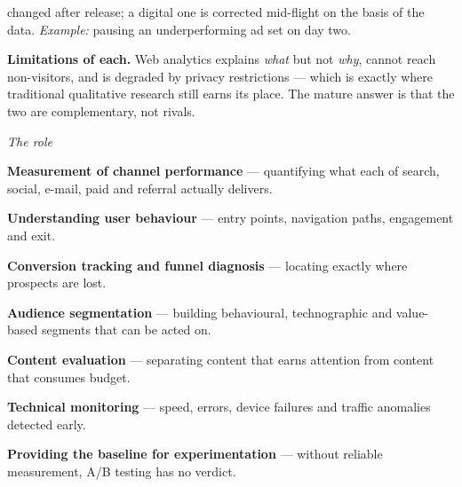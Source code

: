 \begin{qlist}
\begin{apts}
      changed after release; a digital one is corrected mid-flight on the basis
      of the data. \emph{Example:} pausing an underperforming ad set on day two.
\item \textbf{Limitations of each.} Web analytics explains \emph{what} but not
      \emph{why}, cannot reach non-visitors, and is degraded by privacy
      restrictions --- which is exactly where traditional qualitative research
      still earns its place. The mature answer is that the two are complementary,
      not rivals.
\end{apts}

\textit{The role}
\begin{apts}
\item \textbf{Measurement of channel performance} --- quantifying what each of
      search, social, e-mail, paid and referral actually delivers.
\item \textbf{Understanding user behaviour} --- entry points, navigation paths,
      engagement and exit.
\item \textbf{Conversion tracking and funnel diagnosis} --- locating exactly
      where prospects are lost.
\item \textbf{Audience segmentation} --- building behavioural, technographic and
      value-based segments that can be acted on.
\item \textbf{Content evaluation} --- separating content that earns attention
      from content that consumes budget.
\item \textbf{Technical monitoring} --- speed, errors, device failures and
      traffic anomalies detected early.
\item \textbf{Providing the baseline for experimentation} --- without reliable
      measurement, A/B testing has no verdict.
\end{apts}


\end{qlist}

